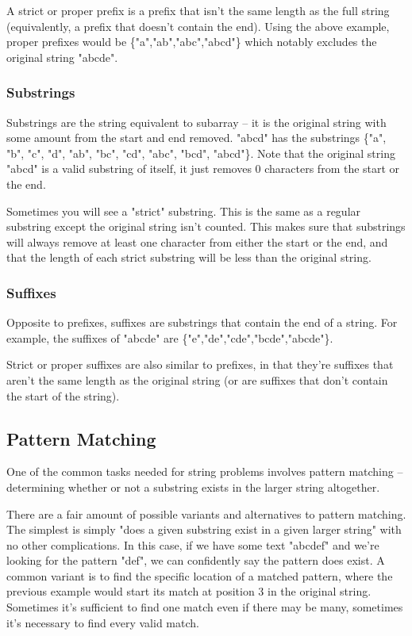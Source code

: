 A strict or proper prefix is a prefix that isn't the same length as the full string (equivalently, a prefix that doesn't contain the end). Using the above example, proper prefixes would be \{"a","ab","abc","abcd"\} which notably excludes the original string "abcde".

\subsubsection{Substrings}

Substrings are the string equivalent to subarray -- it is the original string with some amount from the start and end removed. "abcd" has the substrings \{"a", "b", "c", "d", "ab", "bc", "cd", "abc", "bcd", "abcd"\}. Note that the original string "abcd" is a valid substring of itself, it just removes 0 characters from the start or the end.

Sometimes you will see a "strict" substring. This is the same as a regular substring except the original string isn't counted. This makes sure that substrings will always remove at least one character from either the start or the end, and that the length of each strict substring will be less than the original string.

\subsubsection{Suffixes}

Opposite to prefixes, suffixes are substrings that contain the end of a string. For example, the suffixes of "abcde" are \{"e","de","cde","bcde","abcde"\}.

Strict or proper suffixes are also similar to prefixes, in that they're suffixes that aren't the same length as the original string (or are suffixes that don't contain the start of the string).

\subsection{Pattern Matching}

One of the common tasks needed for string problems involves pattern matching -- determining whether or not a substring exists in the larger string altogether.

There are a fair amount of possible variants and alternatives to pattern matching. The simplest is simply "does a given substring exist in a given larger string" with no other complications. In this case, if we have some text "abcdef" and we're looking for the pattern "def", we can confidently say the pattern does exist. A common variant is to find the specific location of a matched pattern, where the previous example would start its match at position 3 in the original string. Sometimes it's sufficient to find one match even if there may be many, sometimes it's necessary to find every valid match.

